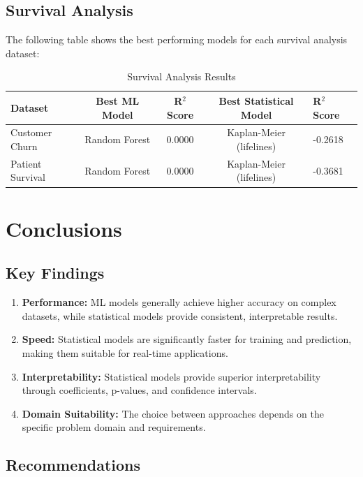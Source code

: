 \documentclass[11pt,a4paper]{article}
\begin{document}
\subsection{Survival Analysis}

The following table shows the best performing models for each survival analysis dataset:

\begin{table}[h!]
\centering
\begin{tabular}{lccc}
\toprule
Dataset & Best ML Model & R$^2$ Score & Best Statistical Model & R$^2$ Score \\
\midrule
Customer Churn & Random Forest & 0.0000 & Kaplan-Meier (lifelines) & -0.2618 \\
Patient Survival & Random Forest & 0.0000 & Kaplan-Meier (lifelines) & -0.3681 \\
\bottomrule
\end{tabular}
\caption{Survival Analysis Results}
\end{table}

\section{Conclusions}

\subsection{Key Findings}

\begin{enumerate}
\item \textbf{Performance:} ML models generally achieve higher accuracy on complex datasets, while statistical models provide consistent, interpretable results.
\item \textbf{Speed:} Statistical models are significantly faster for training and prediction, making them suitable for real-time applications.
\item \textbf{Interpretability:} Statistical models provide superior interpretability through coefficients, p-values, and confidence intervals.
\item \textbf{Domain Suitability:} The choice between approaches depends on the specific problem domain and requirements.
\end{enumerate}

\subsection{Recommendations}
\end{document}
